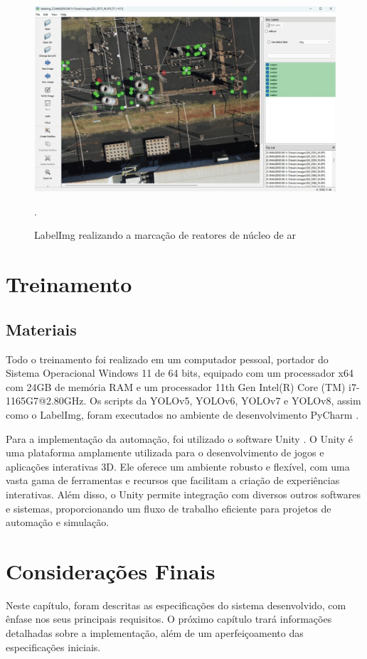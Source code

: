 \begin{figure}[!h]
    \centering
    \begin{minipage}{1\linewidth}
    \centering
    \captionsetup{justification=centering,margin=0.5cm,font=small}
    \includegraphics[width=1\linewidth]{img/cap4/marcacao.jpeg}
    \caption{LabelImg realizando a marcação de reatores de núcleo de ar}.
    \label{fig:reator-marcado}
    \end{minipage}
\end{figure}


\section{Treinamento}

\subsection{Materiais}

Todo o treinamento foi realizado em um computador pessoal, portador do Sistema Operacional Windows 11 de 64 bits, equipado com um processador x64 com 24GB de memória RAM e um processador 11th Gen Intel(R) Core (TM) i7-1165G7@2.80GHz. Os scripts da YOLOv5, YOLOv6, YOLOv7 e YOLOv8, assim como o LabelImg, foram executados no ambiente de desenvolvimento PyCharm \cite{pycharm}.

Para a implementação da automação, foi utilizado o software Unity \cite{unity}. O Unity é uma plataforma amplamente utilizada para o desenvolvimento de jogos e aplicações interativas 3D. Ele oferece um ambiente robusto e flexível, com uma vasta gama de ferramentas e recursos que facilitam a criação de experiências interativas. Além disso, o Unity permite integração com diversos outros softwares e sistemas, proporcionando um fluxo de trabalho eficiente para projetos de automação e simulação.

\section{Considerações Finais}

Neste capítulo, foram descritas as especificações do sistema desenvolvido, com ênfase nos seus principais requisitos. O próximo capítulo trará informações detalhadas sobre a implementação, além de um aperfeiçoamento das especificações iniciais.




